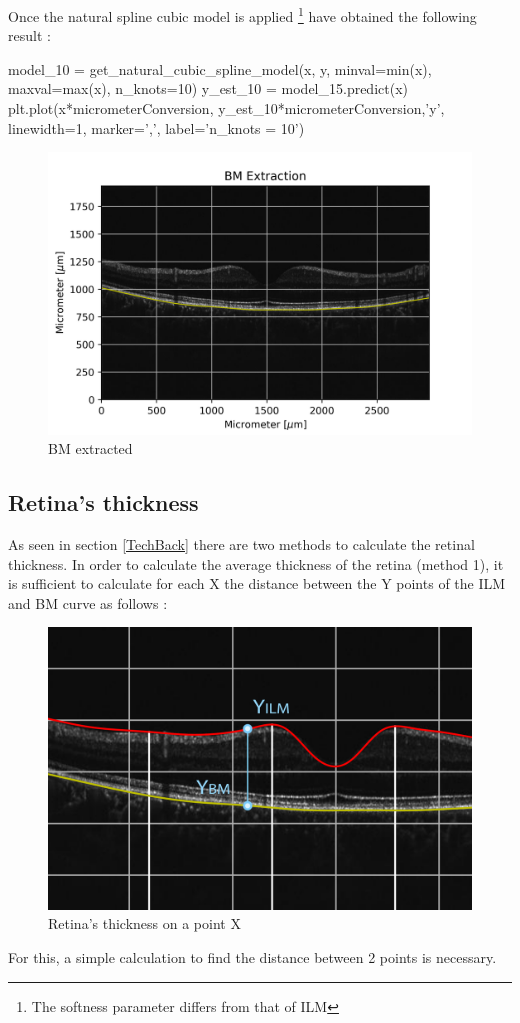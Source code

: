 \documentclass[12pt,a4paper]{scrartcl}
\begin{document}
Once the natural spline cubic model \cite{stackoverflow:transcranial} is applied \footnote{The softness parameter differs from that of ILM} have obtained the following result  :
\begin{python}
model_10 = get_natural_cubic_spline_model(x, y, minval=min(x), maxval=max(x), n_knots=10)
y_est_10 = model_15.predict(x)
plt.plot(x*micrometerConversion, y_est_10*micrometerConversion,'y', linewidth=1, marker=',', label='n_knots = 10')
\end{python}
\begin{figure}[H]
    \centering
    \includegraphics[width=1\textwidth]{./images/BM_FinalImage.png}
    \caption{BM extracted}
    \label{fig:BM-extracted}
\end{figure}

\subsection{Retina's thickness}
As seen in section \ref{TechBack} there are two methods to calculate the retinal thickness.
In order to calculate the average thickness of the retina (method 1), it is sufficient to calculate for each X the distance between the Y points of the ILM and BM curve as follows : 
\begin{figure}[H]
    \centering
    \includegraphics[width=1\textwidth]{./images/ILM_BM_RetinalDistance.png}
    \caption{Retina's thickness on a point X}
    \label{fig:retinat-thickness-x}
\end{figure}
For this, a simple calculation to find the distance between 2 points is necessary. 
\end{document}
